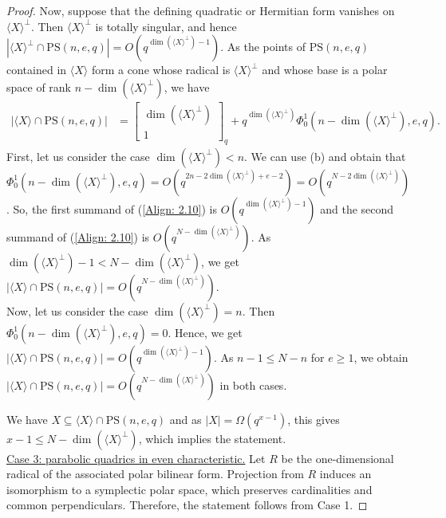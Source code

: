 \documentclass[11pt]{article}
\newcommand{\Gauss}[2]{{\begin{bmatrix} #1 \\ #2 \end{bmatrix}_q}}
\newcommand{\PS}{\mathrm{PS}}
\renewcommand{\leq}{\leqslant}
\renewcommand{\geq}{\geqslant}
\begin{document}
\begin{proof}
Now, suppose that the defining quadratic or Hermitian form vanishes on $\langle X\rangle^\perp$. Then $\langle X\rangle^\perp$ is totally singular, and hence $|\langle X\rangle^\perp\cap\PS(n,e,q)|=O(q^{\dim(\langle X\rangle^\perp)-1})$.
As the points of $\PS(n,e,q)$ contained in $\langle X\rangle$ form a cone whose radical is $\langle X\rangle^\perp$ and whose base is a polar space of rank $n-\dim(\langle X\rangle^\perp)$, we have 
\begin{align} \label{Align: 2.10}
    |\langle X\rangle\cap\PS(n,e,q)|&=\Gauss{\dim(\langle X\rangle^\perp)}{1}+
    q^{\dim(\langle X\rangle^\perp)}
    \Phi_0^1(n-\dim(\langle X\rangle^\perp),e,q). %
\end{align}
First, let us consider the case $\dim(\langle X\rangle^\perp)<n$.
We can use  (b) and obtain that $\Phi_0^1(n-\dim(\langle X\rangle^\perp),e,q)=O(q^{2n-2\dim(\langle X\rangle^\perp)+e-2})=O(q^{N-2\dim(\langle X\rangle^\perp)})$. So, the first summand of (\ref{Align: 2.10}) is  $O(q^{\dim(\langle X\rangle^\perp)-1})$ and the second summand of (\ref{Align: 2.10}) is $O(q^{N-\dim(\langle X\rangle^\perp)})$. As $\dim(\langle X\rangle^\perp)-1<N-\dim(\langle X\rangle^\perp)$, we get $|\langle X\rangle\cap\PS(n,e,q)|=O(q^{N-\dim(\langle X\rangle^\perp)})$.\\
Now, let us consider the case $\dim(\langle X\rangle^\perp)=n$. Then $\Phi_0^1(n-\dim(\langle X\rangle^\perp),e,q)=0$.  Hence, we get $|\langle X\rangle\cap\PS(n,e,q)|=O(q^{\dim(\langle X\rangle^\perp)-1})$. As $n-1\leq N-n$ for $e\geq 1$, we obtain $|\langle X\rangle\cap\PS(n,e,q)|=O(q^{N-\dim(\langle X\rangle^\perp)})$ in both cases.

We have $X\subseteq \langle X \rangle\cap \PS(n,e,q)$ and as $|X|=\Omega(q^{x-1})$, this gives $x-1\leq N-\dim(\langle X\rangle^\perp)$, which implies the statement.\\

\underline{Case 3: parabolic quadrics in even characteristic.}
Let $R$ be the one-dimensional radical of the associated polar bilinear form. Projection from $R$ induces an isomorphism to a symplectic polar space, which preserves cardinalities and common perpendiculars.
Therefore, the statement follows from Case 1.
\end{proof}
\end{document}
